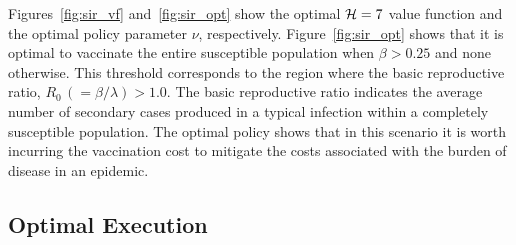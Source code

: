 Figures~\ref{fig:sir_vf} and~\ref{fig:sir_opt} show the optimal {\footnotesize $ \mathcal{H} = 7 $} value function and the optimal policy parameter {\footnotesize $ \nu $}, respectively. Figure~\ref{fig:sir_opt} shows that it is optimal to vaccinate the entire susceptible population when {\footnotesize $ \beta > 0.25 $} and none otherwise. This threshold corresponds to the region where the  basic reproductive ratio, {\footnotesize $ R_0 \,(= \beta/\lambda) > 1.0$}. The basic reproductive ratio indicates the average number of secondary cases produced in a typical infection within a completely susceptible population. The optimal policy shows that in this scenario it is worth incurring the vaccination cost to mitigate the costs associated with the burden of disease in an epidemic.


\subsection{Optimal Execution}
\label{sec:results_oe}

